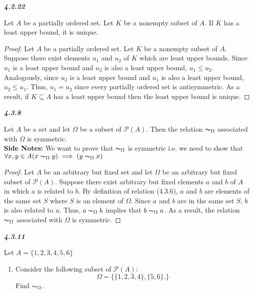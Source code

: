 \documentclass{article}
\let\euscr\mathscr
\begin{document}
\begin{flushleft}
		\pagebreak
		\textbf{\textit{4.2.22}}
		\begin{flushleft}
			Let $A$ be a partially ordered set. Let $K$ be a nonempty subset of $A$. If $K$ has a least upper bound, it is unique.
			\\
			\begin{proof}
				Let $A$ be a partially ordered set. Let $K$ be a nonempty subset of $A$. Suppose there exist elements $u_1$ and $u_2$ of $K$ which are least upper bounds. Since $u_1$ is a least upper bound and $u_2$ is also a least upper bound, $u_1 \leq u_2$. Analogously, since $u_2$ is a least upper bound and $u_1$ is also a least upper bound, $u_2 \leq u_1$. Thus, $u_1 = u_2$ since every partially ordered set is antisymmetric. As a result, if $K \subseteq A$ has a least upper bound then the least upper bound is unique.
			\end{proof}
		\end{flushleft}
		
		\textbf{\textit{4.3.8}}
		\begin{flushleft}
			Let $A$ be a set and let $\Omega$ be a subset of $\euscr{P}(A)$. Then the relation $\thicksim_\Omega$ associated with $\Omega$ is symmetric. 
			\\ \vspace{3mm}
			\textbf{Side Notes:} We want to prove that $\thicksim_\Omega$  is symmetric i.e. we need to show that $\forall x, y \in A (x\thicksim_\Omega y) \implies (y\thicksim_\Omega x)$
			\begin{proof}
				Let $A$ be an arbitrary but fixed set and let $\Omega$ be an arbitrary but fixed subset of $\euscr{P}(A)$. Suppose there exist arbitrary but fixed elements $a$ and $b$ of $A$ in which $a$ is related to $b$. By definition of relation (4.3.6), $a$ and $b$ are elements of the same set $S$ where $S$ is an element of $\Omega$. Since $a$ and $b$ are in the same set $S$, $b$ is also related to $a$. Thus, $a \thicksim_\Omega b$ implies that $b \thicksim_\Omega a$. As a result, the relation $\thicksim_\Omega$ associated with $\Omega$ is symmetric.
			\end{proof}
		\end{flushleft}
		
		\textbf{\textit{4.3.11}}
		\begin{flushleft}
			Let $A= \{1,2,3,4,5,6\}$
			\begin{enumerate}
				\item Consider the following subset of $\euscr{P}(A)$:
				\[\Omega=\{\{1,2,3,4\},\{5,6\}.\}\]
				Find $\thicksim_\Omega$.
				

\end{enumerate}
\end{flushleft}
\end{flushleft}
\end{document}
